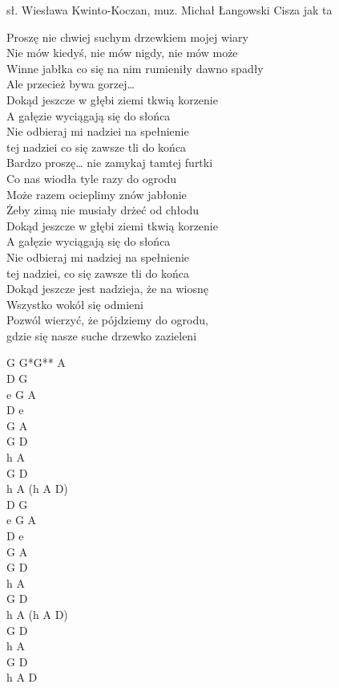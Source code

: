 {sł. Wiesława Kwinto-Koczan, muz. Michał Łangowski}
{Cisza jak ta}
\begin{text}
	\hfill\break
	Proszę nie chwiej suchym drzewkiem mojej wiary\\
	Nie mów kiedyś, nie mów nigdy, nie mów może \\
	Winne jabłka co się na nim rumieniły dawno spadły \\
	Ale przecież bywa gorzej… \\

	Dokąd jeszcze w głębi ziemi tkwią korzenie \\
	A gałęzie wyciągają się do słońca \\
	Nie odbieraj mi nadziei na spełnienie \\
	tej nadziei co się zawsze tli do końca \\

	Bardzo proszę… nie zamykaj tamtej furtki\\
	Co nas wiodła tyle razy do ogrodu\\
	Może razem ocieplimy znów jabłonie\\
	Żeby zimą nie musiały drżeć od chłodu\\

	Dokąd jeszcze w głębi ziemi tkwią korzenie\\
	A gałęzie wyciągają się do słońca\\
	Nie odbieraj mi nadziej na spełnienie\\
	tej nadziei, co się zawsze tli do końca\\

	Dokąd jeszcze jest nadzieja, że na wiosnę\\
	Wszystko wokół się odmieni\\
	Pozwól wierzyć, że pójdziemy do ogrodu,\\
	gdzie się nasze suche drzewko zazieleni\\
\end{text}
\begin{chord}
	G G*G** A\\
	D G\\
	e G A\\
	D e\\
	G A\\

	G D\\
	h A\\
	G D\\
	h A (h A D)\\

	D G\\
	e G A\\
	D e\\
	G A\\

	G D\\
	h A\\
	G D\\
	h A (h A D)\\
	
	G D\\
	h A\\
	G D\\
	h A D
\end{chord}
